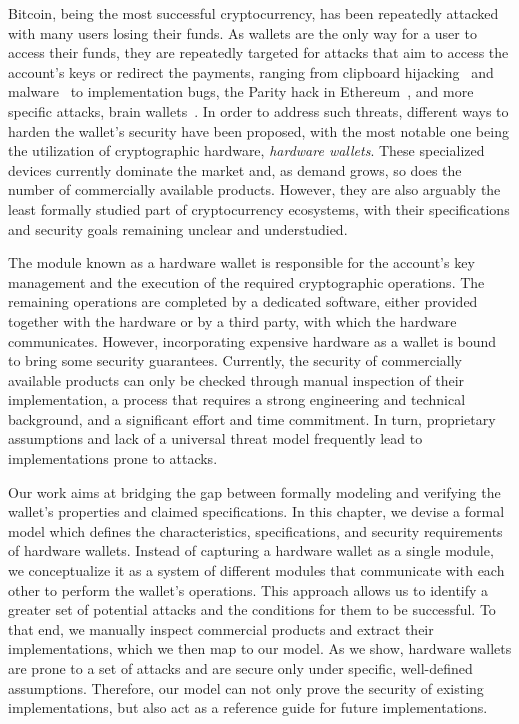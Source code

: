 Bitcoin, being the most successful cryptocurrency, has been repeatedly attacked
with many users losing their funds.  As wallets are the only way for a user to
access their funds, they are repeatedly targeted for attacks that aim to access
the account's keys or redirect the payments, ranging from clipboard
hijacking~\cite{clipboardHijack} and malware~\cite{NDSS:HDMDGM14} to
implementation bugs, \eg the Parity hack in Ethereum~\cite{alois2017ethereum},
and more specific attacks, \eg brain wallets~\cite{FC:VBCKM16}.  In order to
address such threats, different ways to harden the wallet's security have been
proposed, with the most notable one being the utilization of cryptographic
hardware, \ie \emph{hardware wallets}. These specialized devices currently
dominate the market and, as demand grows, so does the number of commercially
available products. However, they are also arguably the least formally studied
part of cryptocurrency ecosystems, with their specifications and security goals
remaining unclear and understudied.

The module known as a hardware wallet is responsible for the account's key
management and the execution of the required cryptographic operations. The
remaining operations are completed by a dedicated software, either provided
together with the hardware or by a third party, with which the hardware
communicates. However, incorporating expensive hardware as a wallet is bound to
bring some security guarantees. Currently, the security of commercially
available products can only be checked through manual inspection of their
implementation, a process that requires a strong engineering and technical
background, and a significant effort and time commitment. In turn, proprietary
assumptions and lack of a universal threat model frequently lead to
implementations prone to attacks.

Our work aims at bridging the gap between formally modeling and verifying the
wallet's properties and claimed specifications. In this chapter, we devise a
formal model which defines the characteristics, specifications, and security
requirements of hardware wallets. Instead of capturing a hardware wallet as a
single module, we conceptualize it as a system of different modules that
communicate with each other to perform the wallet's operations. This approach
allows us to identify a greater set of potential attacks and the conditions for
them to be successful. To that end, we manually inspect commercial products
and extract their implementations, which we then map to our model. As we show,
hardware wallets are prone to a set of attacks and are secure only under
specific, well-defined assumptions. Therefore, our model can not only prove the
security of existing implementations, but also act as a reference guide for
future implementations.

